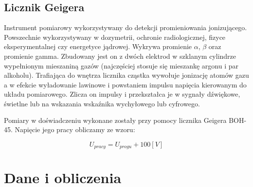 \documentclass[a4paper,11pt]{extarticle}
\begin{document}
  \subsection{Licznik Geigera}
  Instrument pomiarowy wykorzystywany do detekcji promieniowania jonizującego.
  Powszechnie wykorzystywany w dozymetrii, ochronie radiologicznej, fizyce
  eksperymentalnej czy energetyce jądrowej. Wykrywa promienie \( \alpha \),
  \( \beta \) oraz promienie gamma. Zbudowany jest on z dwóch elektrod w szklanym
  cylindrze wypełnionym mieszaniną gazów (najczęściej stosuje się mieszankę
  argonu i par alkoholu). Trafiająca do wnętrza licznika cząstka wywołuje jonizację
  atomów gazu a w efekcie wyładowanie lawinowe i powstaniem impulsu napięcia
  kierowanym do układu pomiarowego. Zlicza on impulsy i przekształca je w sygnały
  dźwiękowe, świetlne lub na wskazania wskaźnika wychyłowego lub cyfrowego.

  Pomiary w doświadczeniu wykonane zostały przy pomocy licznika Geigera BOH-45.
  Napięcie jego pracy obliczamy ze wzoru:
  
  \begin{equation}
    U_{pracy} = U_{progu} + 100[V]
    \label{eq:napiecie_pracy}
  \end{equation}

  \clearpage
  \section{Dane i obliczenia}
\end{document}
